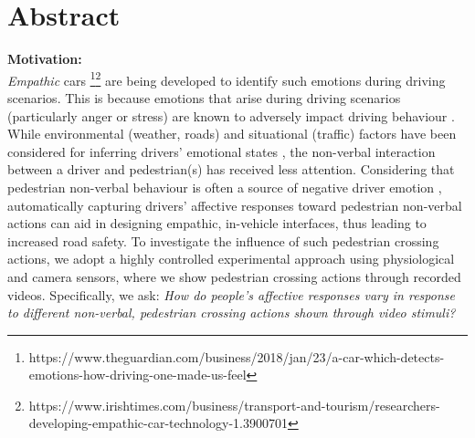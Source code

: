 \documentclass[acmlarge]{acmart}
\begin{document}
\section*{Abstract}
\textbf{Motivation:}  \\
\textit{Empathic} cars \footnote{https://www.theguardian.com/business/2018/jan/23/a-car-which-detects-emotions-how-driving-one-made-us-feel}\footnote{https://www.irishtimes.com/business/transport-and-tourism/researchers-developing-empathic-car-technology-1.3900701} are being developed to identify such emotions during driving scenarios. This is because emotions that arise during driving scenarios (particularly anger or stress) are known to adversely impact driving behaviour \cite{2015:tf:jeon}. While environmental (weather, roads) and situational (traffic) factors have been considered for inferring drivers' emotional states \cite{2018:frontiers:habibovic, 2019:MTI:braun, jeon2016don}, the non-verbal interaction between a driver and pedestrian(s) has received less attention. Considering that pedestrian non-verbal behaviour is often a source of negative driver emotion \cite{zepf2019towards}, automatically capturing drivers' affective responses toward pedestrian non-verbal actions can aid in designing empathic, in-vehicle interfaces, thus leading to increased road safety. To investigate the influence of such pedestrian crossing actions, we adopt a highly controlled experimental approach using physiological and camera sensors, where we show pedestrian crossing actions through recorded videos. Specifically, we ask: \textit{How do people's affective responses vary in response to different non-verbal, pedestrian crossing actions shown through video stimuli?}




\end{document}
